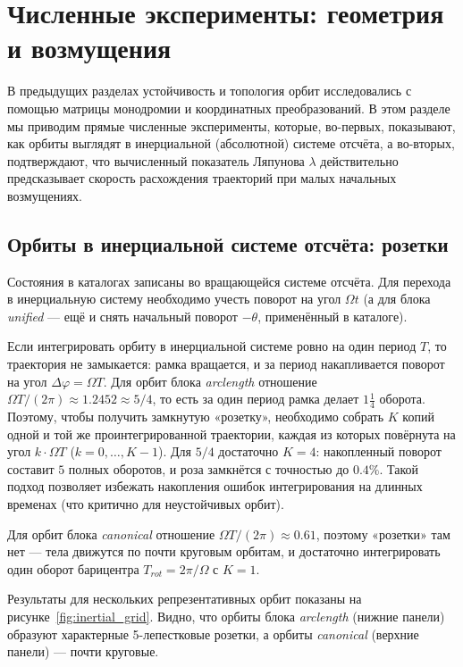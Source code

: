 \section{Численные эксперименты: геометрия и возмущения}

В предыдущих разделах устойчивость и топология орбит исследовались с помощью матрицы монодромии и координатных преобразований. В этом разделе мы приводим прямые численные эксперименты, которые, во-первых, показывают, как орбиты выглядят в инерциальной (абсолютной) системе отсчёта, а во-вторых, подтверждают, что вычисленный показатель Ляпунова \(\lambda\) действительно предсказывает скорость расхождения траекторий при малых начальных возмущениях.

\subsection{Орбиты в инерциальной системе отсчёта: розетки}
Состояния в каталогах записаны во вращающейся системе отсчёта. Для перехода в инерциальную систему необходимо учесть поворот на угол \(\Omega t\) (а для блока \textit{unified} — ещё и снять начальный поворот \(-\theta\), применённый в каталоге).

Если интегрировать орбиту в инерциальной системе ровно на один период \(T\), то траектория не замыкается: рамка вращается, и за период накапливается поворот на угол \(\Delta\varphi = \Omega T\). Для орбит блока \textit{arclength} отношение \(\Omega T / (2\pi) \approx 1.2452 \approx 5/4\), то есть за один период рамка делает \(1\frac{1}{4}\) оборота. Поэтому, чтобы получить замкнутую «розетку», необходимо собрать \(K\) копий одной и той же проинтегрированной траектории, каждая из которых повёрнута на угол \(k \cdot \Omega T\) (\(k = 0, \dots, K-1\)). Для \(5/4\) достаточно \(K=4\): накопленный поворот составит \(5\) полных оборотов, и роза замкнётся с точностью до \(0.4\%\). Такой подход позволяет избежать накопления ошибок интегрирования на длинных временах (что критично для неустойчивых орбит).

Для орбит блока \textit{canonical} отношение \(\Omega T / (2\pi) \approx 0.61\), поэтому «розетки» там нет — тела движутся по почти круговым орбитам, и достаточно интегрировать один оборот барицентра \(T_{rot} = 2\pi/\Omega\) с \(K=1\).

Результаты для нескольких репрезентативных орбит показаны на рисунке~\ref{fig:inertial_grid}. Видно, что орбиты блока \textit{arclength} (нижние панели) образуют характерные 5-лепестковые розетки, а орбиты \textit{canonical} (верхние панели) — почти круговые.

